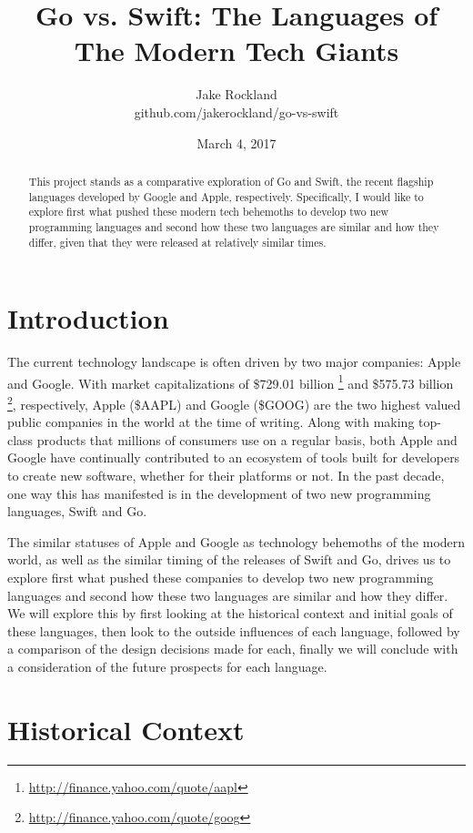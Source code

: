 \documentclass[letterpaper]{article}
\title{Go vs. Swift: The Languages of The Modern Tech Giants}
\author{Jake Rockland \\ github.com/jakerockland/go-vs-swift}
\date{March 4, 2017}
\begin{document}
\begin{titlepage}
\maketitle
\end{titlepage}

\begin{abstract}
This project stands as a comparative exploration of Go and Swift, the recent flagship languages developed by Google and Apple, respectively. Specifically, I would like to explore first what pushed these modern tech behemoths to develop two new programming languages and second how these two languages are similar and how they differ, given that they were released at relatively similar times.
\end{abstract}

\section{Introduction}

The current technology landscape is often driven by two major companies: Apple and Google. With market capitalizations of \$729.01 billion \footnote{\url{http://finance.yahoo.com/quote/aapl}} and \$575.73 billion \footnote{\url{http://finance.yahoo.com/quote/goog}}, respectively, Apple (\$AAPL) and Google (\$GOOG) are the two highest valued public companies in the world at the time of writing. Along with making top-class products that millions of consumers use on a regular basis, both Apple and Google have continually contributed to an ecosystem of tools built for developers to create new software, whether for their platforms or not. In the past decade, one way this has manifested is in the development of two new programming languages, Swift and Go.

The similar statuses of Apple and Google as technology behemoths of the modern world, as well as the similar timing of the releases of Swift and Go, drives us to explore first what pushed these companies to develop two new programming languages and second how these two languages are similar and how they differ. We will explore this by first looking at the historical context and initial goals of these languages, then look to the outside influences of each language, followed by a comparison of the design decisions made for each, finally we will conclude with a consideration of the future prospects for each language.

\section{Historical Context}
\end{document}
